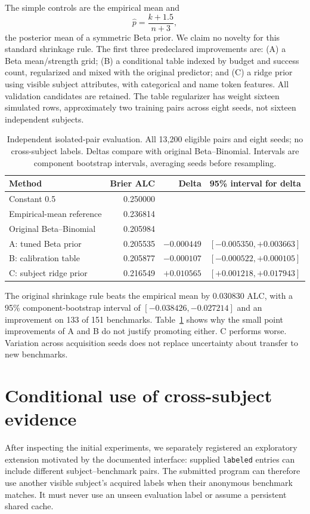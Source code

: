 \documentclass{article}
\begin{document}
The simple controls are the empirical mean and
\begin{equation}
 \widehat p=\frac{k+1.5}{n+3},
\end{equation}
the posterior mean of a symmetric Beta prior. We claim no novelty for this
standard shrinkage rule. The first three predeclared improvements are:
(A) a Beta mean/strength grid; (B) a conditional table indexed by budget and
success count, regularized and mixed with the original predictor; and
(C) a ridge prior using visible subject attributes, with categorical and name
token features. All validation candidates are retained. The table regularizer
has weight sixteen simulated rows, approximately two training pairs across
eight seeds, not sixteen independent subjects.

\begin{table}[t]
\centering\small
\caption{Independent isolated-pair evaluation. All 13,200 eligible pairs and
eight seeds; no cross-subject labels. Deltas compare with original Beta--Binomial.
Intervals are component bootstrap intervals, averaging seeds before resampling.}
\label{tab:initial}
\begin{tabular}{lrrl}
\toprule
Method & Brier ALC & Delta & 95\% interval for delta\\
\midrule
Constant 0.5 & 0.250000 & & \\
Empirical-mean reference & 0.236814 & & \\
Original Beta--Binomial & 0.205984 & & \\
A: tuned Beta prior & 0.205535 & $-0.000449$ & $[-0.005350,+0.003663]$\\
B: calibration table & 0.205877 & $-0.000107$ & $[-0.000522,+0.000105]$\\
C: subject ridge prior & 0.216549 & $+0.010565$ & $[+0.001218,+0.017943]$\\
\bottomrule
\end{tabular}
\end{table}

The original shrinkage rule beats the empirical mean by 0.030830 ALC,
with a 95\% component-bootstrap interval of $[-0.038426,-0.027214]$ and an
improvement on 133 of 151 benchmarks. Table~\ref{tab:initial} shows why the
small point improvements of A and B do not justify promoting either. C
performs worse. Variation across acquisition seeds does not replace
uncertainty about transfer to new benchmarks.

\section{Conditional use of cross-subject evidence}\label{sec:ctx}
After inspecting the initial experiments, we separately registered an
exploratory extension motivated by the documented interface: supplied
\texttt{labeled} entries can include different subject--benchmark pairs.
The submitted program can therefore use another visible subject's acquired
labels when their anonymous benchmark matches. It must never use an unseen
evaluation label or assume a persistent shared cache.
\end{document}
